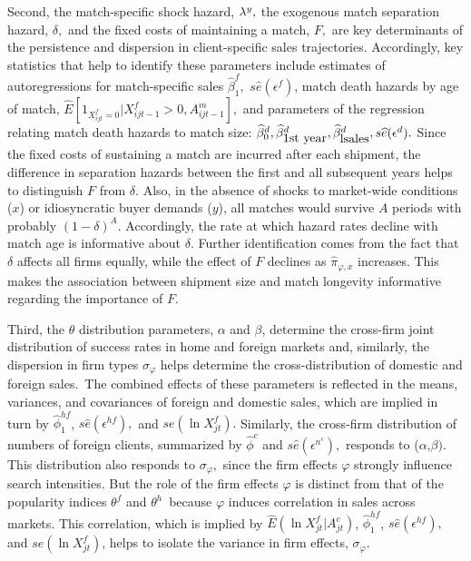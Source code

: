 Second, the match-specific shock hazard, ${\small \lambda }^{y},$ the
exogenous match separation hazard, $\delta ,$ and the fixed costs of
maintaining a match, $F,$ are key determinants of the persistence and
dispersion in client-specific sales trajectories. Accordingly, key
statistics that help to identify these parameters include estimates of
autoregressions for match-specific sales $\widehat{\beta }_{1}^{f},$ $s%
\widehat{e}(\epsilon ^{f})$, match death hazards by age of match, $\widehat{E%
}[1_{X_{ijt}^{f}=0}|X_{ijt-1}^{f}>0,A_{ijt-1}^{m}],$ and parameters of the
regression relating match death hazards to match size: $\widehat{\beta }%
_{0}^{d},\widehat{\beta }_{\mbox{1st year}}^{d},\widehat{\beta }_{%
\mbox{lsales}}^{d},s\widehat{e}(\epsilon ^{d}).$ Since the fixed costs of
sustaining a match are incurred after each shipment, the difference in
separation hazards between the first and all subsequent years helps to
distinguish $F$ from $\delta .$ Also, in the absence of shocks to
market-wide conditions ($x$) or idiosyncratic buyer demands ($y$), all
matches would survive $A$ periods with probably $(1-\delta )^{A}.$
Accordingly, the rate at which hazard rates decline with match age is
informative about $\delta .$ Further identification comes from the fact that 
$\delta $ affects all firms equally, while the effect of $F$ declines as $%
\widehat{\pi }_{\varphi ,x}$ increases. This makes the association between
shipment size and match longevity informative regarding the importance of $%
F. $

Third, the $\theta $ distribution parameters, $\alpha $ and $\beta $,
determine the cross-firm joint distribution of success rates in home and
foreign markets and, similarly, the dispersion in firm types $\sigma
_{\varphi }$ helps determine the cross-distribution of domestic and foreign
sales.\ The combined effects of these parameters is reflected in the means,
variances, and covariances of foreign and domestic sales, which are implied
in turn by $\widehat{\phi }_{1}^{hf}$, $s\widehat{e}(\epsilon ^{hf}),$ and $%
se(\ln X_{jt}^{f}).$ Similarly, the cross-firm distribution of numbers of
foreign clients, summarized by $\widehat{\phi }^{c}$ and $s\widehat{e}%
(\epsilon ^{n^{c}}),$ responds to ($\alpha $,$\beta )$. This distribution
also responds to $\sigma _{\varphi },$ since the firm effects $\varphi $
strongly influence search intensities. But the role of the firm effects $%
\varphi $ is distinct from that of the popularity indices $\theta ^{f}$ and $%
\theta ^{h}$\ because $\varphi $ induces correlation in sales across
markets. This correlation, which is implied by $\widehat{E}(\ln
X_{jt}^{f}|A_{jt}^{c})$, $\widehat{\phi }_{1}^{hf}$, $s\widehat{e}(\epsilon
^{hf}),$ and $se(\ln X_{jt}^{f})$, helps to isolate the variance in firm
effects, $\sigma _{\varphi }.$

